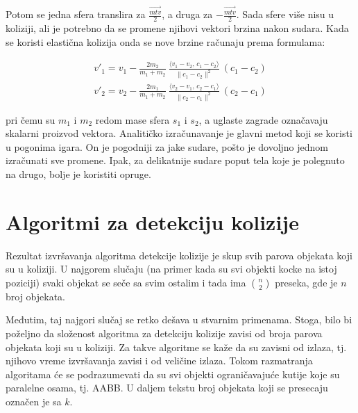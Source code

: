 \documentclass[12pt,oneside]{memoir}
\begin{document}
Potom se jedna sfera translira za $ \frac{ \overrightarrow{mtv} }{ 2 }$, a druga za $ -\frac{ \overrightarrow{mtv} }{ 2 }$.
Sada sfere više nisu u koliziji, ali je potrebno da se promene njihovi vektori brzina nakon sudara.
Kada se koristi elastična kolizija onda se nove brzine računaju prema formulama:


\begin{equation}
	\label{eq:razresenje}
	\begin{split}
		{v}'_1= {v}_1-\frac{2 m_2}{m_1+m_2} \ \frac{\langle  {v}_1- {v}_2,\, {c}_1- {c}_2\rangle}{\| {c}_1- {c}_2\|^2} \ ( {c}_1- {c}_2) \\
		{v}'_2= {v}_2-\frac{2 m_1}{m_1+m_2} \ \frac{\langle  {v}_2- {v}_1,\, {c}_2- {c}_1\rangle}{\| {c}_2- {c}_1\|^2} \ ( {c}_2- {c}_1) 
	\end{split}
\end{equation}


\noindent pri čemu su $m_1$ i $m_2$ redom mase sfera $s_1$ i $s_2$, a uglaste zagrade označavaju skalarni proizvod vektora.
Analitičko izračunavanje je glavni metod koji se koristi u pogonima igara.
On je pogodniji za jake sudare, pošto je dovoljno jednom izračunati sve promene.
Ipak, za delikatnije sudare poput tela koje je polegnuto na drugo, bolje je koristiti opruge.

\chapter{Algoritmi za detekciju kolizije}
\label{sec:algoritmi}

Rezultat izvršavanja algoritma detekcije kolizije je skup svih parova objekata koji su u koliziji.
U najgorem slučaju (na primer kada su svi objekti kocke na istoj poziciji) svaki objekat se seče sa svim ostalim
i tada ima $ {n\choose 2}  $ preseka, gde je $n$ broj objekata. 

Međutim, taj najgori slučaj se retko dešava u stvarnim primenama. 
Stoga, bilo bi poželjno da složenost algoritma za detekciju kolizije zavisi od broja parova objekata koji su u koliziji.
Za takve algoritme se kaže da su zavisni od izlaza, tj. njihovo vreme izvršavanja zavisi i od veličine izlaza. 
Tokom razmatranja algoritama će se podrazumevati da su svi objekti ograničavajuće kutije koje su paralelne osama,
tj. AABB. U daljem tekstu broj objekata koji se presecaju označen je sa $k$.
\end{document}
